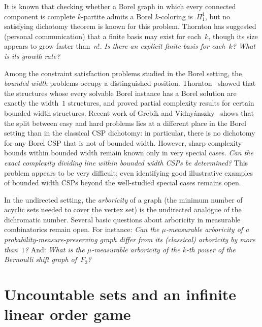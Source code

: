 \begin{question}
	It is known that checking whether a Borel graph in which every connected component is complete $k$-partite admits a Borel $k$-coloring is~$\Pi^1_1$, but no satisfying dichotomy theorem is known for this problem.
	Thornton has suggested (personal communication) that a finite basis may exist for each~$k$, though its size appears to grow faster than~$n!$.
	\emph{Is there an explicit finite basis for each~$k$?  What is its growth rate?}
\end{question}

\begin{question}
	Among the constraint satisfaction problems studied in the Borel setting, the \emph{bounded width} problems occupy a distinguished position.
	Thornton~\cite{thornton2022algebraic} showed that the structures whose every solvable Borel instance has a Borel solution are exactly the width~$1$ structures, and proved partial complexity results for certain bounded width structures.
	Recent work of Grebík and Vidnyánszky~\cite{GV2025} shows that the split between easy and hard problems lies at a different place in the Borel setting than in the classical CSP dichotomy: in particular, there is no dichotomy for any Borel CSP that is not of bounded width.
	However, sharp complexity bounds within bounded width remain known only in very special cases.
	\emph{Can the exact complexity dividing line within bounded width CSPs be determined?}
	This problem appears to be very difficult; even identifying good illustrative examples of bounded width CSPs beyond the well-studied special cases remains open.
\end{question}

\begin{question}
	In the undirected setting, the \emph{arboricity} of a graph (the minimum number of acyclic sets needed to cover the vertex set) is the undirected analogue of the dichromatic number.
	Several basic questions about arboricity in measurable combinatorics remain open.
	For instance:
	\emph{Can the $\mu$-measurable arboricity of a probability-measure-preserving graph differ from its (classical) arboricity by more than~$1$?}
	And: \emph{What is the $\mu$-measurable arboricity of the $k$-th power of the Bernoulli shift graph of~$F_2$?}
\end{question}

\section{Uncountable sets and an infinite linear order game}

